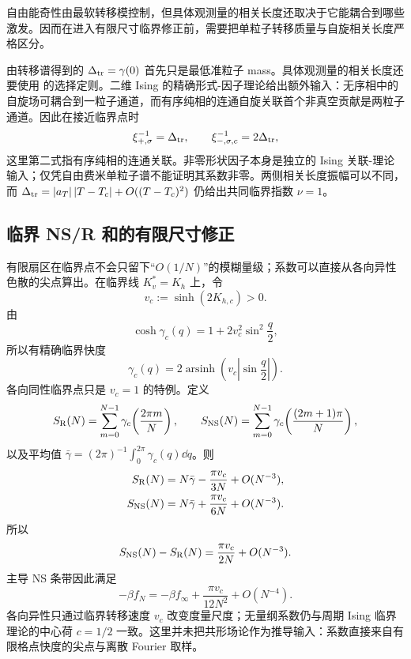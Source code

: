 自由能奇性由最软转移模控制，但具体观测量的相关长度还取决于它能耦合到哪些激发。因而在进入有限尺寸临界修正前，需要把单粒子转移质量与自旋相关长度严格区分。

由转移谱得到的 \(\Delta_{\rm tr}=\gamma(0)\) 首先只是最低准粒子 mass。具体观测量的相关长度还要使用 的选择定则。二维 Ising 的精确形式-因子理论给出额外输入：无序相中的自旋场可耦合到一粒子通道，而有序纯相的连通自旋关联首个非真空贡献是两粒子通道。因此在接近临界点时
\begin{equation}
 \xi_{+,\sigma}^{-1}=\Delta_{\rm tr},
 \qquad
 \xi_{-,\sigma,c}^{-1}=2\Delta_{\rm tr},
 \label{eq:phys-sm-spin-correlation-masses}
\end{equation}
这里第二式指有序纯相的连通关联。非零形状因子本身是独立的 Ising 关联-理论输入；仅凭自由费米单粒子谱不能证明其系数非零。两侧相关长度振幅可以不同，而 \(\Delta_{\rm tr}=|a_T|\,|T-T_c|+O((T-T_c)^2)\) 仍给出共同临界指数 \(\nu=1\)。

\subsection{临界 NS/R 和的有限尺寸修正}

有限扇区在临界点不会只留下“\(O(1/N)\)”的模糊量级；系数可以直接从各向异性色散的尖点算出。在临界线 \(K_v^*=K_h\) 上，令
\[
 v_c:=\sinh(2K_{h,c})>0.
\]
由
\[
 \cosh\gamma_c(q)
 =1+2v_c^2\sin^2\frac q2,
\]
所以有精确临界快度
\begin{equation}
 \gamma_c(q)=2\operatorname{arsinh}
 \left(v_c\left|\sin\frac q2\right|\right).
 \label{eq:phys-sm-critical-anisotropic-rapidity}
\end{equation}
各向同性临界点只是 \(v_c=1\) 的特例。定义
\[
 S_{\rm R}(N)=\sum_{m=0}^{N-1}
 \gamma_c\!\left(\frac{2\pi m}{N}\right),
 \qquad
 S_{\rm NS}(N)=\sum_{m=0}^{N-1}
 \gamma_c\!\left(\frac{(2m+1)\pi}{N}\right),
\]
以及平均值 \(\bar\gamma=(2\pi)^{-1}\int_0^{2\pi}\gamma_c(q)\dd q\)。则
\begin{align}
 S_{\rm R}(N)
 &=N\bar\gamma-\frac{\pi v_c}{3N}+O(N^{-3}),
 \label{eq:phys-sm-critical-r-sum}\\
 S_{\rm NS}(N)
 &=N\bar\gamma+\frac{\pi v_c}{6N}+O(N^{-3}).
 \label{eq:phys-sm-critical-ns-sum}
\end{align}
所以
\begin{equation}
 S_{\rm NS}(N)-S_{\rm R}(N)
 =\frac{\pi v_c}{2N}+O(N^{-3}).
 \label{eq:phys-sm-critical-sector-splitting}
\end{equation}
主导 NS 条带因此满足
\begin{equation}
 -\beta f_N
 =-\beta f_\infty
 +\frac{\pi v_c}{12N^2}+O(N^{-4}).
 \label{eq:phys-sm-critical-free-energy-fss}
\end{equation}
各向异性只通过临界转移速度 \(v_c\) 改变度量尺度；无量纲系数仍与周期 Ising 临界理论的中心荷 \(c=1/2\) 一致。这里并未把共形场论作为推导输入：系数直接来自有限格点快度的尖点与离散 Fourier 取样。

